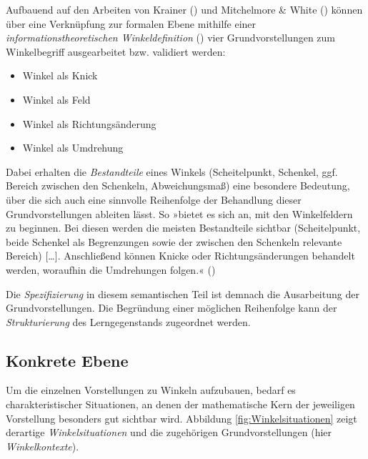 \documentclass[
]{scrbook}
\providecommand{\tightlist}{%
  \setlength{\itemsep}{0pt}\setlength{\parskip}{0pt}}
\theoremstyle{definition}
\theoremstyle{definition}
\theoremstyle{definition}
\theoremstyle{definition}
\theoremstyle{remark}
\begin{document}
Aufbauend auf den Arbeiten von Krainer () und Mitchelmore \& White () können über eine Verknüpfung zur formalen Ebene mithilfe einer \emph{informationstheoretischen Winkeldefinition} () vier Grundvorstellungen zum Winkelbegriff ausgearbeitet bzw. validiert werden:

\begin{itemize}
\tightlist
\item
  Winkel als Knick
\item
  Winkel als Feld
\item
  Winkel als Richtungsänderung
\item
  Winkel als Umdrehung
\end{itemize}

Dabei erhalten die \emph{Bestandteile} eines Winkels (Scheitelpunkt, Schenkel, ggf. Bereich zwischen den Schenkeln, Abweichungsmaß) eine besondere Bedeutung, über die sich auch eine sinnvolle Reihenfolge der Behandlung dieser Grundvorstellungen ableiten lässt. So »bietet es sich an, mit den Winkelfeldern zu beginnen. Bei diesen werden die meisten Bestandteile sichtbar (Scheitelpunkt, beide Schenkel als Begrenzungen sowie der zwischen den Schenkeln relevante Bereich) {[}\ldots{]}. Anschließend können Knicke oder Richtungsänderungen behandelt werden, woraufhin die Umdrehungen folgen.« ()

Die \emph{Spezifizierung} in diesem semantischen Teil ist demnach die Ausarbeitung der Grundvorstellungen. Die Begründung einer möglichen Reihenfolge kann der \emph{Strukturierung} des Lerngegenstands zugeordnet werden.

\subsection{Konkrete Ebene}\label{konkrete-ebene}

Um die einzelnen Vorstellungen zu Winkeln aufzubauen, bedarf es charakteristischer Situationen, an denen der mathematische Kern der jeweiligen Vorstellung besonders gut sichtbar wird. Abbildung \ref{fig:Winkelsituationen} zeigt derartige \emph{Winkelsituationen} und die zugehörigen Grundvorstellungen (hier \emph{Winkelkontexte}).
\end{document}
